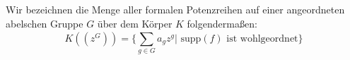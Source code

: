 %
%
%
%
%
%
Wir bezeichnen die Menge aller formalen Potenzreihen auf einer angeordneten abelschen Gruppe $G$ über dem Körper $K$ folgendermaßen: 
\[K\left(\left(z^{G}\right)\right) = \lbrace \sum_{g \in G}^{}a_g z^g | \text{ supp}(f) \text{ ist wohlgeordnet}\rbrace\]
%
%
